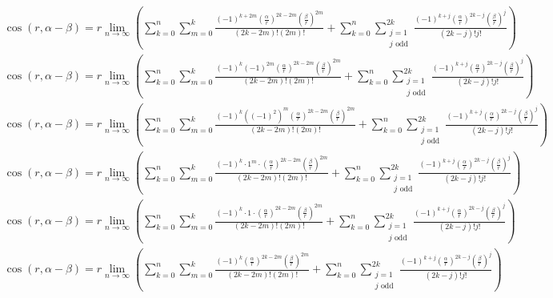 \documentclass[a4paper,12pt]{report}
\begin{document}
\begin{landscape}
{\begin{gather}
\cos(r,\alpha - \beta) = r \lim \limits_{n \to \infty} \left(\sum \limits_{k=0}^{n} \sum \limits_{m=0}^k \frac{(-1)^{k+2m} \left(\frac{\alpha}{r}\right)^{2k-2m} \left(\frac{\beta}{r}\right)^{2m}}{(2k-2m)! (2m)!} + \sum \limits_{k=0}^{n} \sum \limits_{\substack{j=1 \\ j \text{ odd}}}^{2k} \frac{(-1)^{k+j} \left(\frac{\alpha}{r}\right)^{2k-j} \left(\frac{\beta}{r}\right)^j}{(2k-j)! j!}\right) \\
\cos(r,\alpha - \beta) = r \lim \limits_{n \to \infty} \left(\sum \limits_{k=0}^{n} \sum \limits_{m=0}^k \frac{(-1)^k (-1)^{2m} \left(\frac{\alpha}{r}\right)^{2k-2m} \left(\frac{\beta}{r}\right)^{2m}}{(2k-2m)! (2m)!} + \sum \limits_{k=0}^{n} \sum \limits_{\substack{j=1 \\ j \text{ odd}}}^{2k} \frac{(-1)^{k+j} \left(\frac{\alpha}{r}\right)^{2k-j} \left(\frac{\beta}{r}\right)^j}{(2k-j)! j!}\right) \\
\cos(r,\alpha - \beta) = r \lim \limits_{n \to \infty} \left(\sum \limits_{k=0}^{n} \sum \limits_{m=0}^k \frac{(-1)^k ((-1)^2)^m \left(\frac{\alpha}{r}\right)^{2k-2m} \left(\frac{\beta}{r}\right)^{2m}}{(2k-2m)! (2m)!} + \sum \limits_{k=0}^{n} \sum \limits_{\substack{j=1 \\ j \text{ odd}}}^{2k} \frac{(-1)^{k+j} \left(\frac{\alpha}{r}\right)^{2k-j} \left(\frac{\beta}{r}\right)^j}{(2k-j)! j!}\right) \\
\cos(r,\alpha - \beta) = r \lim \limits_{n \to \infty} \left(\sum \limits_{k=0}^{n} \sum \limits_{m=0}^k \frac{(-1)^k \cdot 1^m \cdot \left(\frac{\alpha}{r}\right)^{2k-2m} \left(\frac{\beta}{r}\right)^{2m}}{(2k-2m)! (2m)!} + \sum \limits_{k=0}^{n} \sum \limits_{\substack{j=1 \\ j \text{ odd}}}^{2k} \frac{(-1)^{k+j} \left(\frac{\alpha}{r}\right)^{2k-j} \left(\frac{\beta}{r}\right)^j}{(2k-j)! j!}\right) \\
\cos(r,\alpha - \beta) = r \lim \limits_{n \to \infty} \left(\sum \limits_{k=0}^{n} \sum \limits_{m=0}^k \frac{(-1)^k \cdot 1 \cdot \left(\frac{\alpha}{r}\right)^{2k-2m} \left(\frac{\beta}{r}\right)^{2m}}{(2k-2m)! (2m)!} + \sum \limits_{k=0}^{n} \sum \limits_{\substack{j=1 \\ j \text{ odd}}}^{2k} \frac{(-1)^{k+j} \left(\frac{\alpha}{r}\right)^{2k-j} \left(\frac{\beta}{r}\right)^j}{(2k-j)! j!}\right) \\
\cos(r,\alpha - \beta) = r \lim \limits_{n \to \infty} \left(\sum \limits_{k=0}^{n} \sum \limits_{m=0}^k \frac{(-1)^k \left(\frac{\alpha}{r}\right)^{2k-2m} \left(\frac{\beta}{r}\right)^{2m}}{(2k-2m)! (2m)!} + \sum \limits_{k=0}^{n} \sum \limits_{\substack{j=1 \\ j \text{ odd}}}^{2k} \frac{(-1)^{k+j} \left(\frac{\alpha}{r}\right)^{2k-j} \left(\frac{\beta}{r}\right)^j}{(2k-j)! j!}\right) \\

\end{gather}}
\end{landscape}
\end{document}
